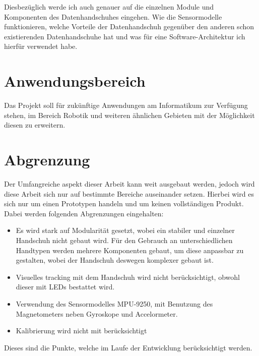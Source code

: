 Diesbezüglich werde ich auch genauer auf die einzelnen Module und Komponenten des Datenhandschuhes eingehen. Wie die Sensormodelle funktionieren, welche Vorteile der Datenhandschuh gegenüber den anderen schon existierenden Datenhandschuhe hat und was für eine Software-Architektur ich hierfür verwendet habe.

\section{Anwendungsbereich}
Das Projekt soll für zukünftige Anwendungen am Informatikum zur Verfügung stehen, im Bereich Robotik und weiteren ähnlichen Gebieten mit der Möglichkeit diesen zu erweitern. 

\section{Abgrenzung} 

Der Umfangreiche aspekt dieser Arbeit kann weit ausgebaut werden, jedoch wird diese Arbeit sich nur auf bestimmte Bereiche auseinander setzen. Hierbei wird es sich nur um einen Prototypen handeln und um keinen vollständigen Produkt. 
Dabei werden folgenden Abgrenzungen eingehalten:

\begin{itemize}
\item Es wird stark auf Modularität gesetzt, wobei ein stabiler und einzelner Handschuh nicht gebaut wird. Für den Gebrauch an unterschiedlichen Handtypen werden mehrere Komponenten gebaut, um diese anpassbar zu gestalten, wobei der Handschuh deswegen komplexer gebaut ist.

\item Visuelles tracking mit dem Handschuh wird nicht berücksichtigt, obwohl dieser mit LEDs bestattet wird. 

\item Verwendung des Sensormodelles MPU-9250, mit Benutzung des Magnetometers neben Gyroskope und Accelormeter.

\item Kalibrierung wird nicht mit berücksichtigt
\end{itemize}
Dieses sind die Punkte, welche im Laufe der Entwicklung berücksichtigt werden.
